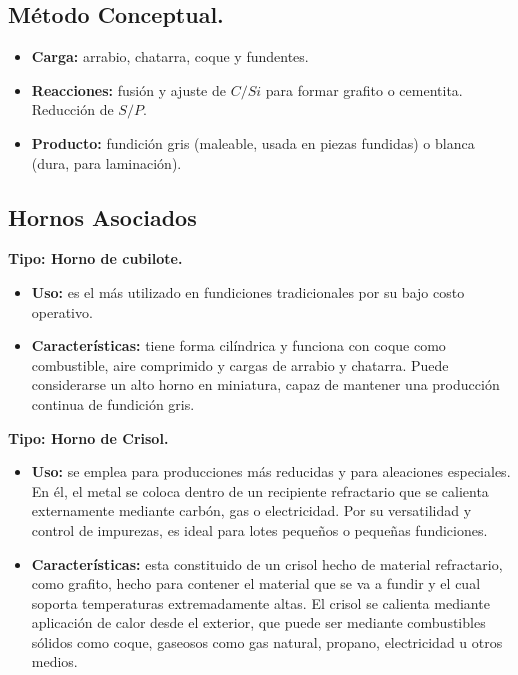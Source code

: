 \documentclass[12pt,a4paper]{article}
\begin{document}
\subsection{Método Conceptual.}
\begin{itemize}
    \item \textbf{Carga:} arrabio, chatarra, coque y fundentes.
    \item \textbf{Reacciones:} fusión y ajuste de $ C/Si$ para formar grafito o cementita. Reducción de $S/P$.
    \item \textbf{Producto:} fundición gris (maleable, usada en piezas fundidas) o blanca (dura, para laminación).
\end{itemize}

\subsection{Hornos Asociados} \label{cubilote_seccion}

\textbf{Tipo: Horno de cubilote.}

\begin{itemize}
    \item \textbf{Uso:} es el más utilizado en fundiciones tradicionales por su bajo costo operativo.
    \item \textbf{Características:} tiene forma cilíndrica y funciona con coque como combustible, aire comprimido y cargas de arrabio y chatarra. Puede considerarse un alto horno en miniatura, capaz de mantener una producción continua de fundición gris.
\end{itemize}

\textbf{Tipo: Horno de Crisol.}

\begin{itemize}
    \item \textbf{Uso:} se emplea para producciones más reducidas y para aleaciones especiales. En él, el metal se coloca dentro de un recipiente refractario que se calienta externamente mediante carbón, gas o electricidad. Por su versatilidad y control de impurezas, es ideal para lotes pequeños o pequeñas fundiciones.
    \item \textbf{Características:} esta constituido de un crisol hecho de material refractario, como grafito, hecho para contener el material que se va a fundir y el cual soporta temperaturas extremadamente altas. El crisol se calienta mediante aplicación de calor desde el exterior, que puede ser mediante combustibles sólidos como coque, gaseosos como gas natural, propano, electricidad u otros medios.
\end{itemize}
\end{document}
